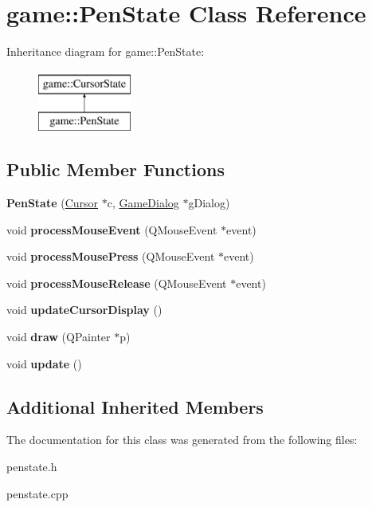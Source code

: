 \hypertarget{classgame_1_1PenState}{}\section{game\+:\+:Pen\+State Class Reference}
\label{classgame_1_1PenState}
Inheritance diagram for game\+:\+:Pen\+State\+:\begin{figure}[H]
\begin{center}
\leavevmode
\includegraphics[height=2.000000cm]{classgame_1_1PenState}
\end{center}
\end{figure}
\subsection*{Public Member Functions}
\begin{DoxyCompactItemize}
\item 
\mbox{\label{classgame_1_1PenState_a88768f37766e3c41bb8ba20b43a98f1a}} 
{\bfseries Pen\+State} (\hyperlink{classgame_1_1Cursor}{Cursor} $\ast$c, \hyperlink{classgame_1_1GameDialog}{Game\+Dialog} $\ast$g\+Dialog)
\item 
\mbox{\label{classgame_1_1PenState_ac3587783b7969de4cde8aab83c2409b1}} 
void {\bfseries process\+Mouse\+Event} (Q\+Mouse\+Event $\ast$event)
\item 
\mbox{\label{classgame_1_1PenState_a65cdd687ea21c668bd38a519d42d4645}} 
void {\bfseries process\+Mouse\+Press} (Q\+Mouse\+Event $\ast$event)
\item 
\mbox{\label{classgame_1_1PenState_abaa4c65c5bf2e5c6a971846505404b19}} 
void {\bfseries process\+Mouse\+Release} (Q\+Mouse\+Event $\ast$event)
\item 
\mbox{\label{classgame_1_1PenState_a6e75396e7a3836cc29346e053e12f043}} 
void {\bfseries update\+Cursor\+Display} ()
\item 
\mbox{\label{classgame_1_1PenState_af6ec931870dc6e85e8155e3a88397f4d}} 
void {\bfseries draw} (Q\+Painter $\ast$p)
\item 
\mbox{\label{classgame_1_1PenState_a87b7c52a9c47d4024352d21365eb063a}} 
void {\bfseries update} ()
\end{DoxyCompactItemize}
\subsection*{Additional Inherited Members}


The documentation for this class was generated from the following files\+:\begin{DoxyCompactItemize}
\item 
penstate.\+h\item 
penstate.\+cpp\end{DoxyCompactItemize}
